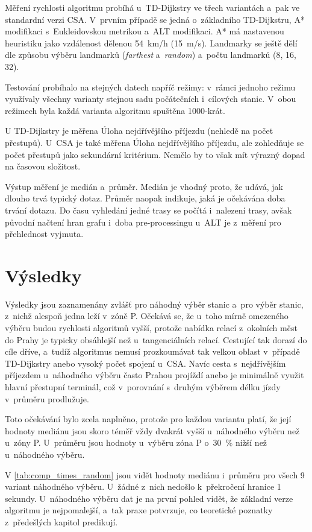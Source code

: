 Měření rychlosti algoritmu probíhá u~TD-Dijkstry ve třech variantách a~pak ve standardní verzi CSA. V~prvním případě se jedná o~základního TD-Dijkstru, A* modifikaci s~Eukleidovskou metrikou a~ALT modifikaci. A* má nastavenou heuristiku jako vzdálenost dělenou 54~km/h (15~m/s). Landmarky se ještě dělí dle způsobu výběru landmarků (\textit{farthest} a~\textit{random}) a~počtu landmarků (8, 16, 32). 

Testování probíhalo na stejných datech napříč režimy: v~rámci jednoho režimu využívaly všechny varianty stejnou sadu počátečních i~cílových stanic. V~obou režimech byla každá varianta algoritmu spuštěna 1000-krát. 

U TD-Dijkstry je měřena Úloha nejdřívějšího příjezdu (nehledě na počet přestupů). U~CSA je také měřena Úloha nejdřívějšího příjezdu, ale zohledňuje se počet přestupů jako sekundární kritérium. Nemělo by to však mít výrazný dopad na časovou složitost.

Výstup měření je medián a~průměr. Medián je vhodný proto, že udává, jak dlouho trvá typický dotaz. Průměr naopak indikuje, jaká je očekávána doba trvání dotazu. Do času vyhledání jedné trasy se počítá i~nalezení trasy, avšak původní načtení hran grafu i~doba pre-processingu u~ALT je z~měření pro přehlednost vyjmuta.

\section{Výsledky}
Výsledky jsou zaznamenány zvlášť pro náhodný výběr stanic a~pro výběr stanic, z~nichž alespoň jedna leží v~zóně P. Očekává se, že u~toho mírně omezeného výběru budou rychlosti algoritmů vyšší, protože nabídka relací z~okolních měst do Prahy je typicky obsáhlejší než u~tangenciálních relací. Cestující tak dorazí do cíle dříve, a~tudíž algoritmus nemusí prozkoumávat tak velkou oblast v~případě TD-Dijkstry anebo vysoký počet spojení u~CSA. Navíc cesta s~nejdřívějším příjezdem u~náhodného výběru často Prahou projíždí anebo je minimálně využit hlavní přestupní terminál, což v~porovnání s~druhým výběrem délku jízdy v~průměru prodlužuje.

Toto očekávání bylo zcela naplněno, protože pro každou variantu platí, že její hodnoty mediánu jsou skoro téměř vždy dvakrát vyšší u~náhodného výběru než u~zóny P. U~průměru jsou hodnoty u~výběru zóna P o~30~\% nižší než u~náhodného výběru.

V \autoref{tab:comp_times_random} jsou vidět hodnoty mediánu i~průměru pro všech 9 variant náhodného výběru. U~žádné z~nich nedošlo k~překročení hranice 1 sekundy. U~náhodného výběru dat je na první pohled vidět, že základní verze algoritmu je nejpomalejší, a~tak praxe potvrzuje, co teoretické poznatky z~předešlých kapitol predikují.

